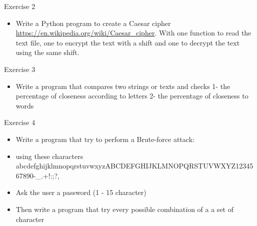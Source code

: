 \documentclass[
  8pt,
  ignorenonframetext,
]{beamer}
\providecommand{\tightlist}{%
  \setlength{\itemsep}{0pt}\setlength{\parskip}{0pt}}
\begin{document}
\begin{frame}{Exercise 2}
\protect\hypertarget{exercise-2}{}
\begin{itemize}
\tightlist
\item
  Write a Python program to create a Caesar cipher
  \url{https://en.wikipedia.org/wiki/Caesar_cipher}. With one function
  to read the text file, one to encrypt the text with a shift and one to
  decrypt the text using the same shift.
\end{itemize}
\end{frame}

\begin{frame}{Exercise 3}
\protect\hypertarget{exercise-3}{}
\begin{itemize}
\tightlist
\item
  Write a program that compares two strings or texts and checks 1- the
  percentage of closeness according to letters 2- the percentage of
  closeness to words
\end{itemize}
\end{frame}

\begin{frame}{Exercise 4}
\protect\hypertarget{exercise-4}{}
\begin{itemize}
\tightlist
\item
  Write a program that try to perform a Brute-force attack:
\item
  using these characters
  abcdefghijklmnopqrstuvwxyzABCDEFGHIJKLMNOPQRSTUVWXYZ1234567890-\_.+!:;?,
\item
  Ask the user a password (1 - 15 character)
\item
  Then write a program that try every possible combination of a a set of
  character
\end{itemize}
\end{frame}
\end{document}
